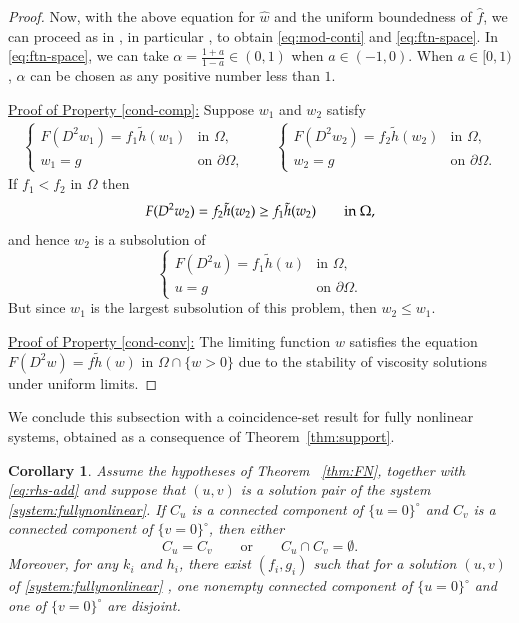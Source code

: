 \documentclass[11pt,oneside,english]{amsart}
\newcommand{\al}{\alpha}
\numberwithin{equation}{section}
\theoremstyle{plain}
\newtheorem{corollary}{Corollary}
\numberwithin{equation}{section}
\begin{document}
\begin{proof}
Now, with the above equation for $\hat w$ and the uniform boundedness of $\hat f$, we can proceed as in \cite{AraTei13}, in particular \cite[Proposition~1 and Theorem~3]{AraTei13}, to obtain \eqref{eq:mod-conti} and \eqref{eq:ftn-space}. In \eqref{eq:ftn-space}, we can take $\al=\frac{1+a}{1-a}\in(0,1)$ when $a\in(-1,0)$. When $a\in[0,1)$, $\al$ can be chosen as any positive number less than $1$.


\medskip


\noindent
\underline{Proof of Property \ref{cond-comp}:} 
 Suppose $w_1$ and $w_2$ satisfy
    \begin{align*}
        \begin{cases}
             F(D^2 w_1)=f_1\tilde h(w_1)&\text{in }\Omega,\\
            w_1=g&\text{on }\partial\Omega,
        \end{cases}\qquad
        \begin{cases}
              F(D^2 w_2)=f_2\tilde h(w_2)&\text{in }\Omega,\\
            w_2=g&\text{on }\partial\Omega.
        \end{cases}
    \end{align*}
   If $f_1<f_2$ in $\Omega$ then 
$$F(D^2w_2)=f_2\tilde h(w_2) \geq   f_1\tilde h(w_2) \qquad \hbox{in } \Omega ,$$ and hence  $w_2$ is a subsolution of
$$\begin{cases}
    F(D^2u)=f_1\tilde h(u)&\text{in }\Omega,\\
    u=g&\text{on }\partial\Omega.
\end{cases}$$
But since  $w_1$ is the largest subsolution of this problem, then $w_2 \leq w_1.$



\medskip

\noindent
\underline{Proof of Property \ref{cond-conv}:} The limiting function $w$ satisfies the equation $F(D^2w)=f\tilde h(w)$ in $\Omega\cap\{w>0\}$ due to the stability of viscosity solutions under uniform limits.  
\end{proof}


We conclude this subsection with a coincidence-set result for fully nonlinear systems, obtained as a consequence of Theorem~\ref{thm:support}.




\begin{corollary}\label{thm:FN-coin}
Assume the hypotheses of Theorem~ \ref{thm:FN}, together with \eqref{eq:rhs-add} and suppose that $(u,v)$ is a  solution pair of the system \eqref{system:fullynonlinear}.
If $C_u$ is a connected component of $\{u=0\}^\circ$ and
$C_v$ is a connected component of $\{v=0\}^\circ$, then either
\[
C_u=C_v
\qquad\text{or}\qquad
C_u\cap C_v=\emptyset.
\]
Moreover, for any $k_i$ and $h_i$, there exist $(f_i,g_i)$ such that for a solution $(u,v)$ of \eqref{system:fullynonlinear} , one nonempty connected component of $\{u=0\}^\circ$ and one of $\{v=0\}^\circ$ are disjoint.
\end{corollary}
\end{document}
